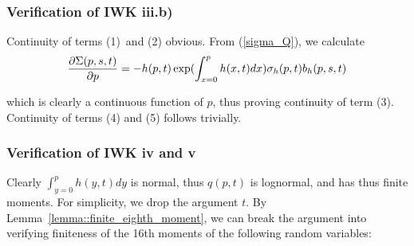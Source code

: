\documentclass{article}
\begin{document}
\subsubsection{Verification of IWK iii.b)}

Continuity of terms (1)\ and (2) obvious. From (\ref{sigma_Q}), we calculate
\begin{equation} %
\frac{\partial \Sigma (p,s,t)}{\partial p}=-{h(p,t)}\exp ({%
\int_{x=0}^{p}h(x,t)dx)}\sigma _{h}(p,t)b_{h}(p,s,t)
\label{dsigmadp_thefirst}
\end{equation}

which is clearly a continuous function of $p$, thus proving continuity of
term (3). Continuity of terms (4) and (5) follows trivially.

\subsubsection{Verification of IWK iv and v}

Clearly ${\int_{y=0}^{p}h(y,t)dy}$ is normal, thus $q(p,t)$ is lognormal,
and has thus finite moments. For simplicity, we drop the argument $t$. By
Lemma~\ref{lemma::finite_eighth_moment}, we can break the argument into
verifying finiteness of the 16th moments of the following random variables:
\end{document}
